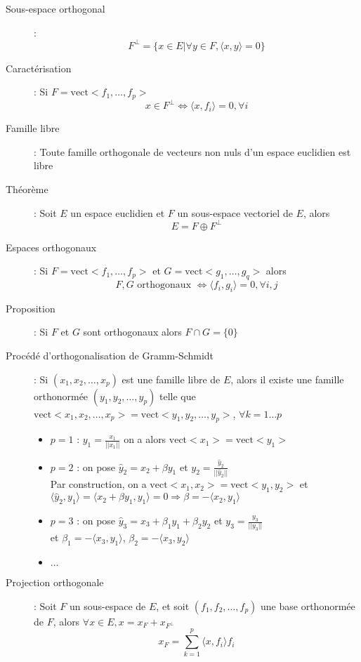 \begin{description}
\item[Sous-espace orthogonal] : \[ F^\perp = \{ x\in E | \forall y\in F, \langle x,y\rangle = 0 \} \]
\item[Caractérisation] : Si $F=\textrm{vect}<f_1,\dots, f_p>$
    \[ x\in F^\perp\Leftrightarrow \langle x,f_i \rangle =0, \forall i \]
\item[Famille libre] : Toute famille orthogonale de vecteurs non nuls d'un espace euclidien est libre
\item[Théorème] : Soit $E$ un espace euclidien et $F$ un sous-espace vectoriel de $E$, alors
    \[ E=F\oplus F^\perp \]
\item[Espaces orthogonaux] : Si $F=\textrm{vect}<f_1,\dots,f_p>$ et $G=\textrm{vect}<g_1,\dots,g_q>$ alors
    \[ F,G\textrm{ orthogonaux }\Leftrightarrow\langle f_i,g_i\rangle=0, \forall i,j \]
\item[Proposition] : Si $F$ et $G$ sont orthogonaux alors $F\cap G=\{0\}$
\item[Procédé d'orthogonalisation de Gramm-Schmidt] : Si $(x_1,x_2,\dots,x_p)$ est une famille libre de $E$, alors il existe une famille orthonormée 
$(y_1,y_2,\dots,y_p)$ telle que $\textrm{vect}<x_1,x_2,\dots,x_p>=\textrm{vect}<y_1,y_2,\dots,y_p>$, $\forall k=1\dots p$
    \begin{itemize}
        \item $p=1$ : $y_1=\frac{x_1}{||x_1||}$ on a alors $\textrm{vect}<x_1>=\textrm{vect}<y_1>$
        \item $p=2$ : on pose $\hat y_2=x_2+\beta y_1$ et $y_2=\frac{\hat y_2}{||\hat y_2||}$\\
        Par construction, on a $\textrm{vect}<x_1, x_2>=\textrm{vect}<y_1,y_2>$ et $\langle\hat y_2,y_1\rangle=\langle x_2+\beta y_1,y_1\rangle=0 \Rightarrow\beta=-\langle x_2,y_1\rangle$
        \item $p=3$ : on pose $\hat y_3=x_3+\beta_1y_1+\beta_2y_2$ et $y_3=\frac{y_3}{||y_3||}$\\
        et $\beta_1=-\langle x_3,y_1 \rangle$, $\beta_2=-\langle x_3,y_2\rangle$
        \item $\dots$
    \end{itemize}
\item[Projection orthogonale] : Soit $F$ un sous-espace de $E$, et soit $(f_1,f_2,\dots,f_p)$ une base orthonormée de $F$, alors $\forall x\in E, x=x_F+x_{F^\perp}$
    \[
        x_F=\sum_{k=1}^p\langle x,f_i\rangle f_i
    \]
\end{description}
